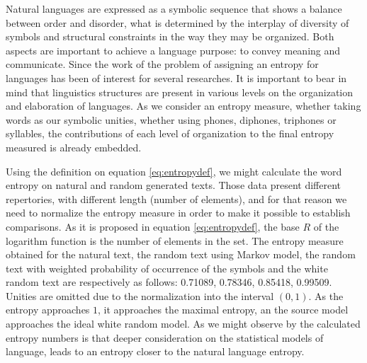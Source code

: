 Natural languages are expressed as a symbolic sequence that shows a balance between
order and disorder, what is determined by the interplay of diversity of symbols
and structural constraints in the way they may be organized. Both aspects
are important to achieve a language purpose: to convey meaning and communicate.
Since the work of \cite{shannon1948} the problem of assigning an entropy for languages
has been of interest for several researches. It is important to bear in mind that
linguistics structures are present in various levels on the organization and
elaboration of languages. As we consider an entropy measure, whether taking 
words as our symbolic unities, whether using phones, diphones, triphones or syllables,
the contributions of each level of organization to 
the final entropy measured is already embedded.

Using the definition on equation \ref{eq:entropydef}, we might calculate the word entropy
on natural and random generated texts. Those data present different repertories, with
different length (number of elements), and for that reason we need to normalize the
entropy measure in order to make it possible to establish comparisons. As it is
proposed in equation \ref{eq:entropydef}, the base $R$ of the logarithm function is
the number of elements in the set. The entropy measure obtained for the natural text,
the random text using Markov model, the random text with weighted probability of 
occurrence of the symbols and the white random text are respectively as follows:
0.71089, 0.78346, 0.85418, 0.99509. Unities are omitted due to the normalization
into the interval $(0,1)$. As the entropy approaches $1$, it approaches the maximal
entropy, an the source model approaches the ideal white random model. As we might
observe by the calculated entropy numbers is that deeper consideration on the 
statistical models of language, leads to an entropy closer to the natural language entropy.



